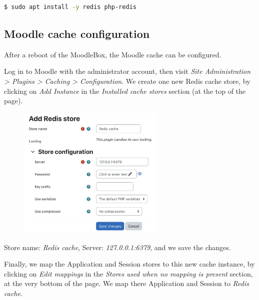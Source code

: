 \documentclass[12pt]{article}
\begin{document}
\begin{lstlisting}[language=bash]
$ sudo apt install -y redis php-redis
\end{lstlisting}

\subsection{Moodle cache configuration}\label{ssec-cache}

After a reboot of the MoodleBox, the Moodle cache can be configured.

Log in to Moodle with the administrator account, then visit \textsl{Site Administration > Plugins > Caching > Configuration}.
We create one new Redis cache store, by clicking on \emph{Add Instance} in the \emph{Installed cache stores} section (at the top of the page).

\begin{figure}[!ht]
\centering
\includegraphics[width=7cm]{cache-redis.png}
\end{figure}

Store name: \emph{Redis cache}, Server: \emph{127.0.0.1:6379}, and we save the changes.

Finally, we map the Application and Session stores to this new cache instance, by clicking on \emph{Edit mappings} in the \emph{Stores used when no mapping is present} section, at the very bottom of the page.
We map there Application and Session to \emph{Redis cache}.

\end{document}
